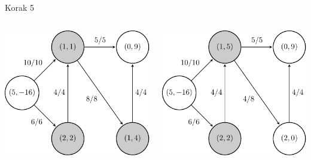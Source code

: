 \documentclass{beamer}
\begin{document}
\begin{frame}{Korak 5}
    \begin{columns}
        \begin{column}{0.5\textwidth}
            \centering
            \includegraphics[scale=0.7]{../writing/images/graf2-6.pdf}
        \end{column}
        \pause
        \begin{column}{0.5\textwidth}
            \centering
            \includegraphics[scale=0.7]{../writing/images/graf2-7.pdf}
        \end{column}
    \end{columns}
\end{frame}
\end{document}
